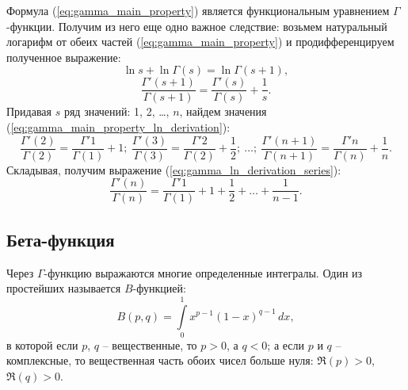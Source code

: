 \begin{remark}
Формула (\ref{eq:gamma_main_property}) является функциональным уравнением
\( \Gamma \)-функции. Получим из него еще одно важное следствие: возьмем
натуральный логарифм от обеих частей (\ref{eq:gamma_main_property}) и
продифференцируем полученное выражение:
\[
    \ln{s} + \ln{\Gamma(s)} = \ln{\Gamma(s+1)},
\]
\begin{equation}
    \frac{\Gamma'(s+1)}{\Gamma(s+1)} =
    \frac{\Gamma'(s)}{\Gamma(s)} + \frac{1}{s}.
    \label{eq:gamma_main_property_ln_derivation}
\end{equation}
Придавая \( s \) ряд значений: 1, 2, \ldots, \( n \), найдем значения
(\ref{eq:gamma_main_property_ln_derivation}):
\[
    \frac{\Gamma'(2)}{\Gamma(2)} = \frac{\Gamma'{1}}{\Gamma(1)} + 1;\ 
    \frac{\Gamma'(3)}{\Gamma(3)} = \frac{\Gamma'{2}}{\Gamma(2)} + \frac{1}{2};\ 
    \ldots;\ 
    \frac{\Gamma'(n+1)}{\Gamma(n+1)} =
    \frac{\Gamma'{n}}{\Gamma(n)} + \frac{1}{n}.
\]
Складывая, получим выражение (\ref{eq:gamma_ln_derivation_series}):
\begin{equation}
    \frac{\Gamma'(n)}{\Gamma(n)} =
    \frac{\Gamma'{1}}{\Gamma(1)} + 1 + \frac{1}{2} + \ldots + \frac{1}{n-1}.
    \label{eq:gamma_ln_derivation_series}
\end{equation}
\end{remark}

\subsection{Бета-функция}

Через \( \Gamma \)-функцию выражаются многие определенные интегралы. Один из
простейших называется \( B \)-функцией:
\begin{equation}
    B(p, q) = \int\limits_0^1 x^{p -1} (1-x)^{q-1}\,dx,
    \label{eq:beta_int_def}
\end{equation}
в которой если \( p \), \( q \) -- вещественные,  то \( p > 0 \), а \( q < 0 \);
а если \( p \) и \( q \) -- комплексные, то вещественная часть обоих чисел
больше нуля: \( \Re(p) > 0 \), \( \Re(q) > 0 \).

